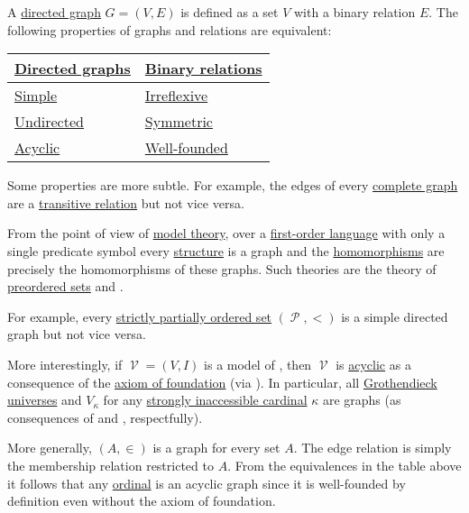 \begin{remark}\label{rem:directed_graphs_model_theory}
  A \hyperref[def:directed_graph]{directed graph} \( G = (V, E) \) is defined as a set \( V \) with a binary relation \( E \). The following properties of graphs and relations are equivalent:
  \begin{center}
    \begin{tabular}{l | l}
      \hyperref[def:directed_graph]{Directed graphs}           & \hyperref[def:binary_relation]{Binary relations} \\
      \hline
      \hyperref[def:directed_graph/simple]{Simple}             & \hyperref[def:binary_relation/irreflexive]{Irreflexive} \\
      \hyperref[def:undirected_graph]{Undirected}              & \hyperref[def:binary_relation/symmetric]{Symmetric} \\
      \hyperref[def:graph_paths/undirected_path]{Acyclic}      & \hyperref[def:well_founded_relation]{Well-founded} \\
    \end{tabular}
  \end{center}

  Some properties are more subtle. For example, the edges of every \hyperref[def:graph_adjacency/complete_graph]{complete graph} are a \hyperref[def:binary_relation/transitive]{transitive relation} but not vice versa.

  From the point of view of \hyperref[subsec:first_order_models]{model theory}, over a \hyperref[def:first_order_language]{first-order language} with only a single predicate symbol every \hyperref[def:first_order_structure]{structure} is a graph and the \hyperref[def:first_order_homomorphism]{homomorphisms} are precisely the homomorphisms of these graphs. Such theories are the theory of \hyperref[def:preordered_set]{preordered sets} and \hyperref[def:zfc]{}.

  For example, every \hyperref[def:partially_ordered_set/strict]{strictly partially ordered set} \( (\mscrP, <) \) is a simple directed graph but not vice versa.

  More interestingly, if \( \mscrV = (V, I) \) is a model of \hyperref[def:zfc]{}, then \( \mscrV \) is \hyperref[def:graph_paths/undirected_path]{acyclic} as a consequence of the \hyperref[def:zfc/foundation]{axiom of foundation} (via ). In particular, all \hyperref[def:grothendieck_universe]{Grothendieck universes} and \( V_\kappa \) for any \hyperref[def:regular_cardinal]{strongly inaccessible cardinal} \( \kappa \) are graphs (as consequences of  and , respectfully).

  More generally, \( (A, \in) \) is a graph for every set \( A \). The edge relation is simply the membership relation restricted to \( A \). From the equivalences in the table above it follows that any \hyperref[def:ordinal]{ordinal} is an acyclic graph since it is well-founded by definition even without the axiom of foundation.
\end{remark}
